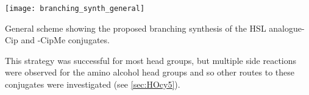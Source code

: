 \begin{scheme}[H]
	\begin{center}
		\texttt{[image: branching\_synth\_general]}
		\caption{General scheme showing the proposed branching synthesis of the HSL analogue-Cip and -CipMe conjugates.\label{sch:branching_synth_general}}
	\end{center}
\end{scheme}

This strategy was successful for most head groups, but multiple side reactions were observed for the amino alcohol head groups and so other routes to these conjugates were investigated (see \ref{sec:HOcy5}).
